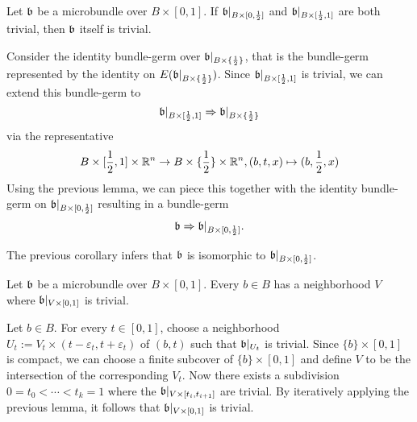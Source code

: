 \begin{file}
\newcommand{\A}[1][] {
    A_\alpha#1
}

\newcommand{\bbleft} {
    \bb\restr{B \times{} [0, \half]}
}
\newcommand{\bbright} {
    \bb\restr{B \times{} [\half, 1]}
}
\newcommand{\bbhalf} {
    \bb\restr{B \times{} \{ \half \}}
}

\begin{mylemma}\label{homotopy::lemma1}
    Let $\mathfrak{b}$ be a microbundle over $B \times [0, 1]$. If $\bbleft$ and $\bbright$ are both trivial,
    then $\mathfrak{b}$ itself is trivial.
\end{mylemma}
\begin{myproof}
    Consider the identity bundle-germ over $\bbhalf$, that is the bundle-germ represented by the identity on $E(\bbhalf)$.
    Since $\bbright$ is trivial, we can extend this bundle-germ to 
    \[ \bbright \double \bbhalf \]
    via the representative
    \[ B \times [\frac{1}{2}, 1] \times \mathbb{R}^n \to B \times \{\frac{1}{2}\} \times \mathbb{R}^n, (b, t, x) \mapsto (b, \frac{1}{2}, x) \]
    Using the previous lemma, we can piece this together with the identity bundle-germ on $\bbleft$ resulting in a bundle-germ
    \[ \bb \double \bbleft. \]

    The previous corollary infers that $\mathfrak{b}$ is isomorphic to $\bbleft$.
\end{myproof}

\begin{mylemma}\label{homotopy::lemma2}
    Let $\mathfrak{b}$ be a microbundle over $B \times [0, 1]$.
    Every $b \in B$ has a neighborhood $V$ where $\mathfrak{b}\vert_{V \times [0, 1]}$ is trivial.
\end{mylemma}
\begin{myproof}
    Let $b \in B$.
    For every $t \in [0, 1]$, choose a neighborhood $U_t := V_t \times (t - \varepsilon_t, t + \varepsilon_t)$ of $(b, t)$ such that $\mathfrak{b}\vert_{U_t}$ is trivial.
    Since $\{b\} \times [0, 1]$ is compact, we can choose a finite subcover of $\{b\} \times [0, 1]$ and define $V$ to be the intersection of the corresponding $V_t$.
    Now there exists a subdivision $0 = t_0 < \cdots < t_k = 1$ where the $\mathfrak{b}\vert_{V \times [t_{i}, t_{i + 1}]}$ are trivial.
    By iteratively applying the previous lemma, it follows that $\mathfrak{b}\vert_{V \times [0, 1]}$ is trivial.
\end{myproof}


\end{file}
